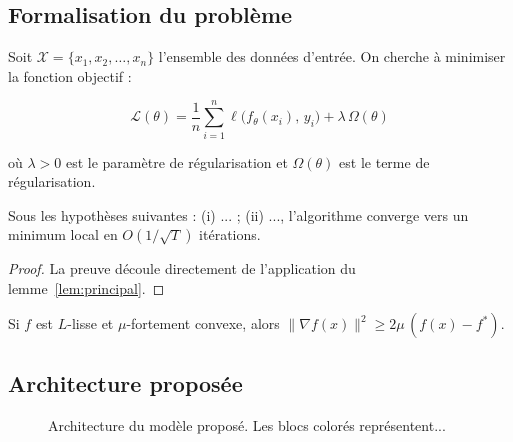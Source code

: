 
\subsection{Formalisation du problème}

Soit $\mathcal{X} = \{x_1, x_2, \ldots, x_n\}$ l'ensemble des données d'entrée. 
On cherche à minimiser la fonction objectif :

\begin{equation}
  \mathcal{L}(\theta) = \frac{1}{n} \sum_{i=1}^{n} \ell\bigl(f_\theta(x_i),\, y_i\bigr) + \lambda\,\Omega(\theta)
  \label{eq:objectif}
\end{equation}

où $\lambda > 0$ est le paramètre de régularisation et $\Omega(\theta)$ est le terme de régularisation.

\begin{theorem}[Convergence]
  Sous les hypothèses suivantes : (i) ... ; (ii) ..., l'algorithme converge vers un minimum local en $O(1/\sqrt{T})$ itérations.
\end{theorem}
\begin{proof}
  La preuve découle directement de l'application du lemme~\ref{lem:principal}.
\end{proof}

\begin{lemma}
  \label{lem:principal}
  Si $f$ est $L$-lisse et $\mu$-fortement convexe, alors $\|\nabla f(x)\|^2 \geq 2\mu\,(f(x) - f^*)$.
\end{lemma}

\subsection{Architecture proposée}

\lipsum[8]

\begin{figure}[H]
  \centering
  \caption{Architecture du modèle proposé. Les blocs colorés représentent...}
  \label{fig:architecture}
\end{figure}
